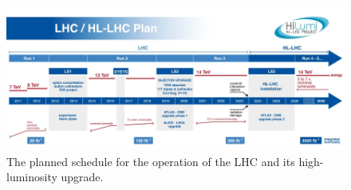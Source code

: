 \begin{figure}[h!]
  \centering
  \includegraphics[width=\textwidth]{Figures/HGCAL/LHCschedule.jpg}
  \caption[Planned LHC and HL-LHC schedule.]
  {
    The planned schedule for the operation of the LHC and its high-luminosity upgrade.
  }
  \label{fig:hgcal_LHCschedule}
\end{figure}

